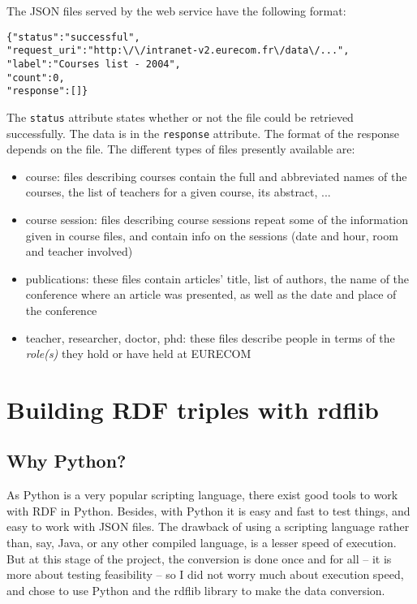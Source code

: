 \documentclass[a4paper,11pt]{report}
\begin{document}
The JSON files served by the web service have the following format: 
\begin{verbatim}
{"status":"successful",
"request_uri":"http:\/\/intranet-v2.eurecom.fr\/data\/...",
"label":"Courses list - 2004",
"count":0,
"response":[]}
\end{verbatim}
The \texttt{status} attribute states whether or not the file could be retrieved successfully. The data is in the \texttt{response} attribute. The format of the response depends on the file. The different types of files presently available are: 
\begin{itemize}
\item course: files describing courses contain the full and abbreviated names of the courses, the list of teachers for a given course, its abstract, ...
\item course session: files describing course sessions repeat some of the information given in course files, and contain info on the sessions (date and hour, room and teacher involved)
\item publications:  these files contain articles' title, list of authors, the name of the conference where an article was presented, as well as the date and place of the conference
\item teacher, researcher, doctor, phd: these files describe people in terms of the \emph{role(s)} they hold or have held at EURECOM
\end{itemize}


\section{Building RDF triples with rdflib}
\subsection{Why Python?}
As Python is a very popular scripting language, there exist good tools to work with RDF in Python. Besides, with Python it is easy and fast to test things, and easy to work with JSON files. The drawback of using a scripting language rather than, say, Java, or any other compiled language, is a lesser speed of execution. But at this stage of the project, the conversion is done once and for all -- it is more about testing feasibility -- so I did not worry much about execution speed, and chose to use Python and the rdflib library to make the data conversion.
\end{document}
